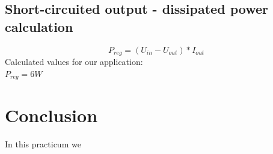 \subsection{Short-circuited output - dissipated power calculation} \label{ssec:num16}
{
	\begin{equation}
		P_{reg} = (U_{in} - U_{out} ) * I_{out}
	\end{equation}
	Calculated values for our application:\\
	$ P_{reg} = 6W $ \\
}

\clearpage
\section{Conclusion}
{
In this practicum we
}

\clearpage